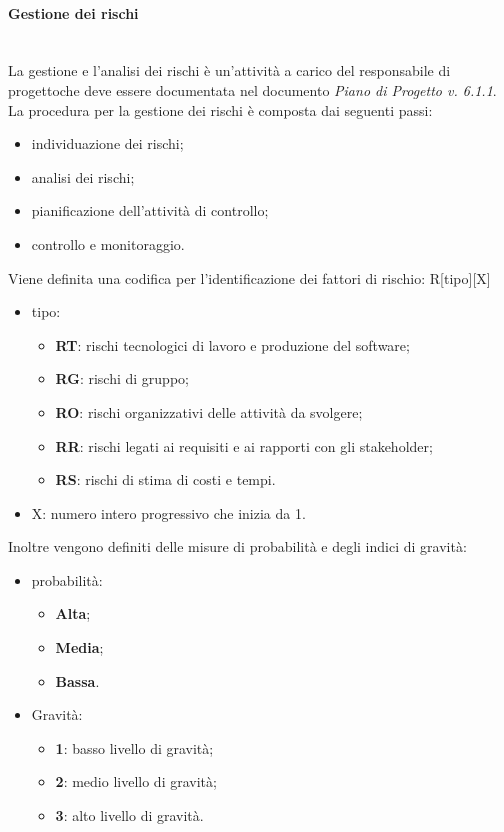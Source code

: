 		\paragraph{Gestione dei rischi}\mbox{}\\ [1mm]
		La gestione e l'analisi dei rischi è un'attività a carico del responsabile di progetto\glosp che deve essere documentata nel documento \textit{Piano di Progetto v. 6.1.1}.
		La procedura per la gestione dei rischi è composta dai seguenti passi:
		\begin{itemize}
			\item individuazione dei rischi;
			\item analisi dei rischi;
			\item pianificazione dell'attività di controllo;
			\item controllo e monitoraggio.
		\end{itemize}
		Viene definita una codifica per l'identificazione dei fattori di rischio: R[tipo][X]
		\begin{itemize}
			\item tipo:
			\begin{itemize}
				\item \textbf{RT}: rischi tecnologici di lavoro e produzione del software;
				\item \textbf{RG}: rischi di gruppo;
				\item \textbf{RO}: rischi organizzativi delle attività da svolgere;
				\item \textbf{RR}: rischi legati ai requisiti e ai rapporti con gli stakeholder\glo;
				\item \textbf{RS}: rischi di stima di costi e tempi.
			\end{itemize}
			\item X: numero intero progressivo che inizia da 1.
		\end{itemize}
		Inoltre vengono definiti delle misure di probabilità e degli indici di gravità:
		\begin{itemize}
			\item probabilità:
			\begin{itemize}
				\item \textbf{Alta};
				\item \textbf{Media};
				\item \textbf{Bassa}.
			\end{itemize}
			\item Gravità:
			\begin{itemize}
				\item \textbf{1}: basso livello di gravità;
				\item \textbf{2}: medio livello di gravità;
				\item \textbf{3}: alto livello di gravità.
			\end{itemize}
		\end{itemize}

